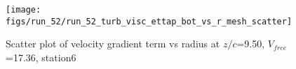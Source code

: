 \begin{figure}[H]
\centering
\texttt{[image: figs/run\_52/run\_52\_turb\_visc\_ettap\_bot\_vs\_r\_mesh\_scatter]}
\caption{Scatter plot of velocity gradient term vs radius at $z/c$=9.50, $V_{free}$=17.36, station6}
\label{fig:run_52_turb_visc_ettap_bot_vs_r_mesh_scatter}
\end{figure}


